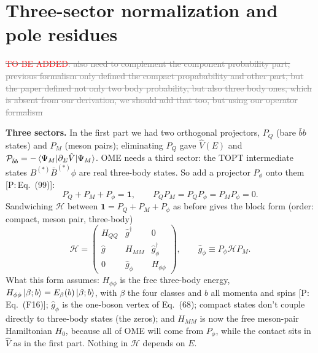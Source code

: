 \documentclass[11pt,a4paper]{article}
\newcommand{\tagP}[1]{\textcolor{blue!65!black}{\textsf{\small[P:\,#1]}}}
\newcommand{\Pbb}{{\cal P}_{\bar bb}}
\newcommand{\todo}{\textcolor{red}{TO BE ADDED}}
\newcommand{\aifix}[2]{\textcolor{gray}{\sout{#1}} \textcolor{aicolor}{#2}}
\newcommand{\aifix}[2]{#2}
\newenvironment{aiadd}{\par}{\par}
\begin{document}
\section{Three-sector normalization and pole residues}
\label{sec:three-sectors}

\aifix{\todo: also need to complement the component probability part, previous formalism only defined the compact propabability and other part, but the paper defined not only two body probability, but also three body ones, which is absent from our derivation, we should add that too, but using our operator formalism}{}

\begin{aiadd}
	\textbf{Three sectors.} In the first part we had two orthogonal projectors, $P_Q$ (bare $\bar bb$ states) and $P_M$ (meson pairs); eliminating $P_Q$ gave $\hat V(E)$ and $\Pbb=-\braket{\Psi_M|\partial_E\hat V|\Psi_M}$. OME needs a third sector: the TOPT intermediate states $B^{(*)}\bar B^{(*)}\phi$ are real three-body states. So add a projector $P_\phi$ onto them \tagP{Eq.~(99)}:
	\[
		P_Q+P_M+P_\phi=\bm 1,\qquad P_QP_M=P_QP_\phi=P_MP_\phi=0 .
	\]
	Sandwiching $\mathcal H$ between $\bm 1=P_Q+P_M+P_\phi$ as before gives the block form (order: compact, meson pair, three-body)
	\[
		\mathcal H=\begin{pmatrix}H_{QQ}&\hat g^\dagger&0\\ \hat g&H_{MM}&\hat g_\phi^\dagger\\ 0&\hat g_\phi&H_{\phi\phi}\end{pmatrix},\qquad \hat g_\phi\equiv P_\phi\mathcal HP_M .
	\]
	What this form assumes: $H_{\phi\phi}$ is the free three-body energy, $H_{\phi\phi}\ket{\beta;b}=E_\beta(b)\ket{\beta;b}$, with $\beta$ the four classes and $b$ all momenta and spins \tagP{Eq.~(F16)}; $\hat g_\phi$ is the one-boson vertex of Eq.~(68); compact states don't couple directly to three-body states (the zeros); and $H_{MM}$ is now the free meson-pair Hamiltonian $H_0$, because all of OME will come from $P_\phi$, while the contact sits in $\hat V$ as in the first part. Nothing in $\mathcal H$ depends on $E$.


\end{aiadd}
\end{document}
